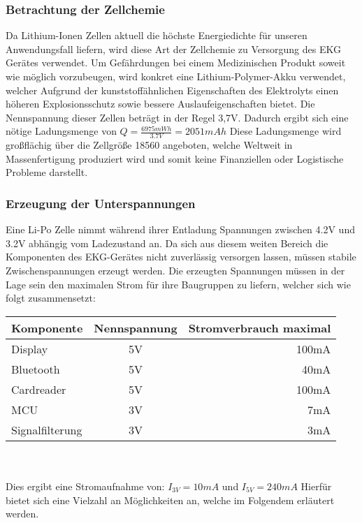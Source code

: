 \subsubsection{Betrachtung der Zellchemie}


Da Lithium-Ionen Zellen aktuell die höchste Energiedichte für unseren Anwendungsfall liefern, wird diese Art der Zellchemie zu Versorgung des EKG Gerätes verwendet. Um Gefährdungen bei einem Medizinischen Produkt soweit wie möglich vorzubeugen, wird konkret eine Lithium-Polymer-Akku verwendet, welcher Aufgrund der kunststoffähnlichen Eigenschaften des Elektrolyts einen höheren Explosionsschutz sowie bessere Auslaufeigenschaften bietet.
Die Nennspannung dieser Zellen beträgt in der Regel 3,7V. Dadurch ergibt sich eine nötige Ladungsmenge von 
$Q = \frac{6975mWh}{3.7V} = 2051mAh $
Diese Ladungsmenge wird großflächig über die Zellgröße 18560 angeboten, welche Weltweit in Massenfertigung produziert wird und somit keine Finanziellen oder Logistische Probleme darstellt.


\subsubsection{Erzeugung der Unterspannungen}

Eine Li-Po Zelle nimmt während ihrer Entladung Spannungen zwischen 4.2V und 3.2V abhängig vom Ladezustand an. Da sich aus diesem weiten Bereich die Komponenten des EKG-Gerätes nicht zuverlässig versorgen lassen, müssen stabile Zwischenspannungen erzeugt werden. Die erzeugten Spannungen müssen in der Lage sein den maximalen Strom für ihre Baugruppen zu liefern, welcher sich wie folgt zusammensetzt:\\

\begin{tabular}[h]{l|c|r}
Komponente & Nennspannung & Stromverbrauch maximal\\
\hline
Display & 5V & 100mA \\
Bluetooth & 5V & 40mA \\
Cardreader & 5V & 100mA \\
MCU & 3V & 7mA \\
Signalfilterung & 3V & 3mA \\
\end{tabular}
\\
\\
Dies ergibt eine Stromaufnahme von: $I_{3V} = 10mA$ und $I_{5V} = 240mA$
Hierfür bietet sich eine Vielzahl an Möglichkeiten an, welche im Folgendem erläutert werden.\\

